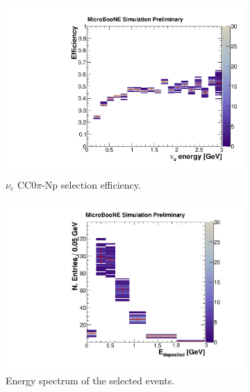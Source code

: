 \begin{figure}[htbp]
  \begin{center}
    \begin{subfigure}{0.49\textwidth}
      \includegraphics[width=\linewidth]{figures/eff_ene_genie.pdf}
      \caption{$\nu_{e}$ CC0$\pi$-Np selection efficiency.}  \label{fig:eff_genie}
    \end{subfigure}\hfill
    \begin{subfigure}{0.49\textwidth}
      \includegraphics[width=\linewidth]{figures/reco_genie.pdf}
      \caption{Energy spectrum of the selected events.}  \label{fig:reco_genie}
    \end{subfigure}
    \begin{subfigure}{0.49\textwidth}

\end{subfigure}
\end{center}
\end{figure}
